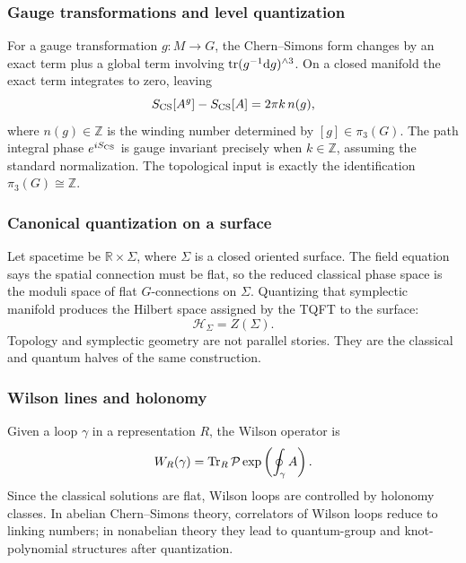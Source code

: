 \subsubsection{Gauge transformations and level quantization}

For a gauge transformation $g : M \to G$, the Chern--Simons form changes by an exact term plus a global term involving $\operatorname{tr}(g^{-1}\mathrm{d} g)^{\wedge 3}$. On a closed manifold the exact term integrates to zero, leaving
\begin{equation}
  S_{\operatorname{CS}}[A^g]-S_{\operatorname{CS}}[A]
  =2\pi k\, n(g),
\end{equation}
where $n(g)\in\mathbb{Z}$ is the winding number determined by $[g]\in\pi_3(G)$. The path integral phase $e^{iS_{\operatorname{CS}}}$ is gauge invariant precisely when $k\in\mathbb{Z}$, assuming the standard normalization. The topological input is exactly the identification $\pi_3(G)\cong \mathbb{Z}$.

\subsubsection{Canonical quantization on a surface}

Let spacetime be $\mathbb{R}\times\Sigma$, where $\Sigma$ is a closed oriented surface. The field equation says the spatial connection must be flat, so the reduced classical phase space is the moduli space of flat $G$-connections on $\Sigma$. Quantizing that symplectic manifold produces the Hilbert space assigned by the TQFT to the surface:
\begin{equation}
  \mathcal{H}_\Sigma = Z(\Sigma).
\end{equation}
Topology and symplectic geometry are not parallel stories. They are the classical and quantum halves of the same construction.

\subsubsection{Wilson lines and holonomy}

Given a loop $\gamma$ in a representation $R$, the Wilson operator is
\begin{equation}
  W_R(\gamma)=\operatorname{Tr}_R \mathcal{P}\exp\left(\oint_\gamma A\right).
\end{equation}
Since the classical solutions are flat, Wilson loops are controlled by holonomy classes. In abelian Chern--Simons theory, correlators of Wilson loops reduce to linking numbers; in nonabelian theory they lead to quantum-group and knot-polynomial structures after quantization.

